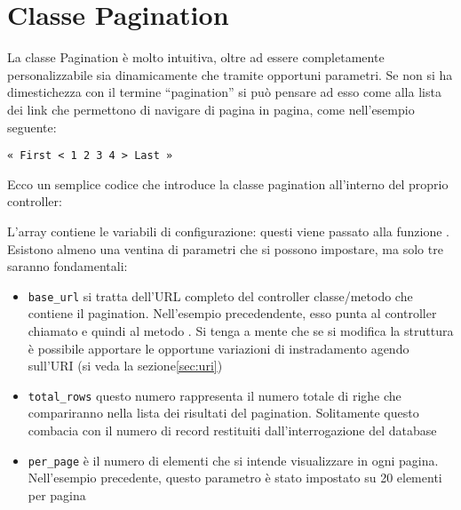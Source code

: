 \section{Classe Pagination}
\label{class:paginatura}

La classe Pagination è molto intuitiva, oltre ad essere completamente personalizzabile sia dinamicamente che tramite opportuni parametri. Se non si ha dimestichezza con il termine ``pagination'' si può pensare ad esso come alla lista dei link che permettono di navigare di pagina in pagina, come nell'esempio seguente:

\verb|« First < 1 2 3 4 > Last »|

Ecco un semplice codice che introduce la classe pagination all'interno del proprio controller:


L'array  contiene le variabili di configurazione: questi viene passato alla funzione . Esistono almeno una ventina di parametri che si possono impostare, ma solo tre saranno fondamentali:

\begin{itemize}
\item \verb|base_url| si tratta dell'URL completo del controller classe/metodo che contiene il pagination. Nell'esempio precedendente, esso punta al controller chiamato  e quindi al metodo . Si tenga a mente che se si modifica la struttura è possibile apportare le opportune variazioni di instradamento agendo sull'URI (si veda la sezione\vref{sec:uri})
\item \verb|total_rows| questo numero rappresenta il numero totale di righe che compariranno nella lista dei risultati del pagination. Solitamente questo combacia con il numero di record restituiti dall'interrogazione del database
\item \verb|per_page| è il numero di elementi che si intende visualizzare in ogni pagina. Nell'esempio precedente, questo parametro è stato impostato su 20 elementi per pagina
\end{itemize}

